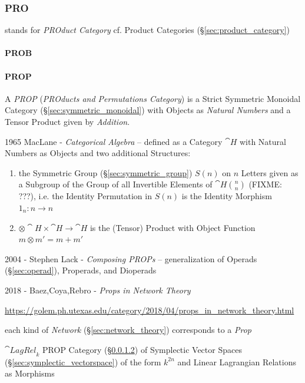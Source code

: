 \subsubsection{PRO}\label{sec:pro_category}

stands for \emph{PROduct Category} \fist cf. Product Categories
(\S\ref{sec:product_category})



\paragraph{PROB}\label{sec:prob_category}\hfill

\paragraph{PROP}\label{sec:prop_category}\hfill

A \emph{PROP} (\emph{PROducts and Permutations Category}) is a Strict Symmetric
Monoidal Category (\S\ref{sec:symmetric_monoidal}) with Objects as
\emph{Natural Numbers} and a Tensor Product given by \emph{Addition}.

1965 MacLane - \emph{Categorical Algebra} -- defined as a Category $\cat{H}$
with Natural Numbers as Objects and two additional Structures:
\begin{enumerate}
  \item the Symmetric Group (\S\ref{sec:symmetric_group}) $S(n)$ on $n$ Letters
    given as a Subgroup of the Group of all Invertible Elements of
    $\cat{H}\binom{n}{n}$ (FIXME: ???), i.e. the Identity Permutation in $S(n)$
    is the Identity Morphism $1_n : n \rightarrow n$
  \item $\otimes \cat{H} \times \cat{H} \rightarrow \cat{H}$ is the (Tensor)
    Product with Object Function $m \otimes m' = m + m'$
\end{enumerate}

2004 - Stephen Lack - \emph{Composing PROPs} -- generalization of Operads
(\S\ref{sec:operad}), Properads, and Dioperads

2018 - Baez,Coya,Rebro - \emph{Props in Network Theory}

\url{https://golem.ph.utexas.edu/category/2018/04/props_in_network_theory.html}

each kind of \emph{Network} (\S\ref{sec:network_theory}) corresponds to a
\emph{Prop}

$\cat{LagRel}_k$ PROP Category (\S\ref{sec:prop_category}) of Symplectic Vector
Spaces (\S\ref{sec:symplectic_vectorspace}) of the form $k^{2n}$ and Linear
Lagrangian Relations as Morphisms

